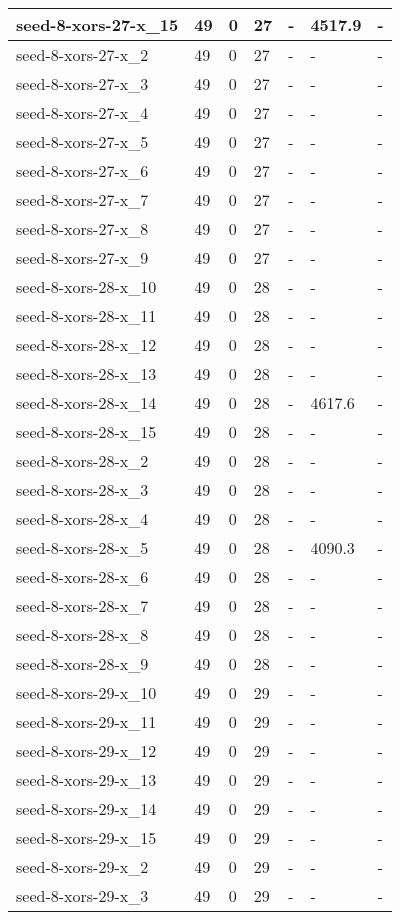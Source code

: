 \begin{scriptsize}
\begin{longtable}{|p{5cm}|l|l|l|l|l|l|}
seed-8-xors-27-x\_15&49&0&27&-&4517.9&- \\ \hline 
seed-8-xors-27-x\_2&49&0&27&-&-&- \\ \hline 
seed-8-xors-27-x\_3&49&0&27&-&-&- \\ \hline 
seed-8-xors-27-x\_4&49&0&27&-&-&- \\ \hline 
seed-8-xors-27-x\_5&49&0&27&-&-&- \\ \hline 
seed-8-xors-27-x\_6&49&0&27&-&-&- \\ \hline 
seed-8-xors-27-x\_7&49&0&27&-&-&- \\ \hline 
seed-8-xors-27-x\_8&49&0&27&-&-&- \\ \hline 
seed-8-xors-27-x\_9&49&0&27&-&-&- \\ \hline 
seed-8-xors-28-x\_10&49&0&28&-&-&- \\ \hline 
seed-8-xors-28-x\_11&49&0&28&-&-&- \\ \hline 
seed-8-xors-28-x\_12&49&0&28&-&-&- \\ \hline 
seed-8-xors-28-x\_13&49&0&28&-&-&- \\ \hline 
seed-8-xors-28-x\_14&49&0&28&-&4617.6&- \\ \hline 
seed-8-xors-28-x\_15&49&0&28&-&-&- \\ \hline 
seed-8-xors-28-x\_2&49&0&28&-&-&- \\ \hline 
seed-8-xors-28-x\_3&49&0&28&-&-&- \\ \hline 
seed-8-xors-28-x\_4&49&0&28&-&-&- \\ \hline 
seed-8-xors-28-x\_5&49&0&28&-&4090.3&- \\ \hline 
seed-8-xors-28-x\_6&49&0&28&-&-&- \\ \hline 
seed-8-xors-28-x\_7&49&0&28&-&-&- \\ \hline 
seed-8-xors-28-x\_8&49&0&28&-&-&- \\ \hline 
seed-8-xors-28-x\_9&49&0&28&-&-&- \\ \hline 
seed-8-xors-29-x\_10&49&0&29&-&-&- \\ \hline 
seed-8-xors-29-x\_11&49&0&29&-&-&- \\ \hline 
seed-8-xors-29-x\_12&49&0&29&-&-&- \\ \hline 
seed-8-xors-29-x\_13&49&0&29&-&-&- \\ \hline 
seed-8-xors-29-x\_14&49&0&29&-&-&- \\ \hline 
seed-8-xors-29-x\_15&49&0&29&-&-&- \\ \hline 
seed-8-xors-29-x\_2&49&0&29&-&-&- \\ \hline 
seed-8-xors-29-x\_3&49&0&29&-&-&- \\ \hline 

\end{longtable}
\end{scriptsize}
